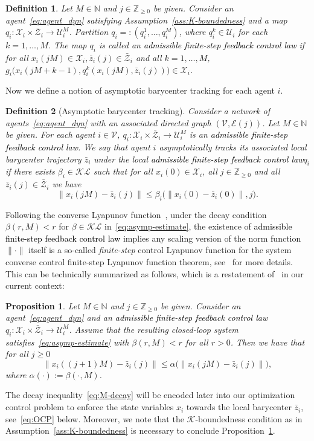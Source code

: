\documentclass[12pt,draftcls,onecolumn]{IEEEtran}
\newtheorem{definition}{Definition}
\newtheorem{proposition}{Proposition}
\def\field#1{\mathbb #1}%
\def\N{\field{N}}%
\def\Z{\field{Z}}%
\newcommand{\X}{\ensuremath{\mathcal X}}
\newcommand{\U}{\ensuremath{\mathcal U}}
\newcommand{\Zp}{\Z_{\geq 0}}
\def\K{\mathcal{K}}%
\def\KL{\mathcal{KL}}%
\def\V{\mathcal{V}}
\def\Zb{\bar{\mathcal{Z}}}
\def\zbi{\bar{z}_i}
\providecommand{\afcl}{\textcolor{black}{admissible finite-step feedback control law}\xspace}
\begin{document}
\begin{definition} \label{def:afcl}
Let $M \in \N$ and $j \in \Zp$ be given.
Consider an agent~\eqref{eq:agent_dyn} satisfying Assumption~\ref{ass:K-boundedness} and a map $q_i: \X_i \times \Zb_i \to \U_i^M$.
Partition $q_i =: (q_i^1,\dots,q_i^M)$, where $q_i^k \in \U_i$ for each $k = 1,\dots,M$.
The map ${q_i}$ is called an \emph{\afcl} if for all $x_i(jM) \in \X_i, \bar{z}_i (j) \in \Zb_i$ and all $k = 1,\dots,M$, $g_i \big(x_i (jM+k-1),q_i^k (x_i(jM),\bar{z}_i(j) )\big)\in \X_i$.
\end{definition}
Now we define a notion of asymptotic barycenter tracking for each agent $i$.
\begin{definition}[Asymptotic barycenter tracking] \label{def:barycenter-tracking}
Consider a network of agents~\eqref{eq:agent_dyn} with an associated directed graph $(\V,\mathcal{E}(j))$.
Let $M \in \N$ be given.
For each agent $i \in \V$, $q_i \colon \X_i \times \Zb_i \to \U_i^M$ is an \afcl.
We say that agent $i$ asymptotically tracks its associated local barycenter trajectory $\zbi$ under the local \afcl $q_i$ if there exists $\beta_i \in \KL$ such that for all $x_i(0) \in \X_i$, all $j \in \Zp$ and all $\zbi (j) \in \Zb_i$ we have
\begin{equation} \label{eq:asymp-estimate}
\|x_i (jM) - \zbi (j)\| \leq \beta_i\big(\|x_i(0) - \bar{z}_i(0)\|, j \big) .
\end{equation}
\end{definition}
Following the converse Lyapunov function~\cite[Theorem~10]{Noroozi.2020}, under the decay condition $\beta(r,M) < r$ for $\beta\in\KL$ in~\eqref{eq:asymp-estimate},
the existence of \afcl implies any scaling version of the norm function $\|\cdot\|$ itself is a so-called \emph{finite-step} control Lyapunov
function for the system
converse control finite-step Lyapunov function theorem, see~\cite{Noroozi.2020} for more details.
This can be technically summarized as follows, which is a restatement of~\cite[Theorem~10]{Noroozi.2020} in our current context:

\begin{proposition}\label{prop:fsCLF}
Let $M \in \N$ and $j \in \Zp$ be given.
Consider an agent~\eqref{eq:agent_dyn} and an \afcl $q_i: \X_i \times \Zb_i \to \U_i^M$.
Assume that the resulting closed-loop system satisfies~\eqref{eq:asymp-estimate} with $\beta(r,M) < r$ for all $r > 0$.
Then we have that for all $j \geq 0$
\begin{equation} \label{eq:M-decay}
\|x_i ((j+1)M) - \bar{z}_i (j)\| \leq \alpha\big(\|x_i(jM) - \bar{z}_i(j)\|\big) ,
\end{equation}
where $\alpha (\cdot):= \beta(\cdot,M)$.
\end{proposition}
The decay inequality~\eqref{eq:M-decay} will be encoded later into our optimization control problem to enforce the state variables $x_i$ towards the local barycenter $\zbi$, see~\eqref{eq:OCP} below.
Moreover, we note that the $\K$-boundedness condition as in Assumption~\ref{ass:K-boundedness} is necessary to conclude Proposition~\ref{prop:fsCLF}.
\end{document}
